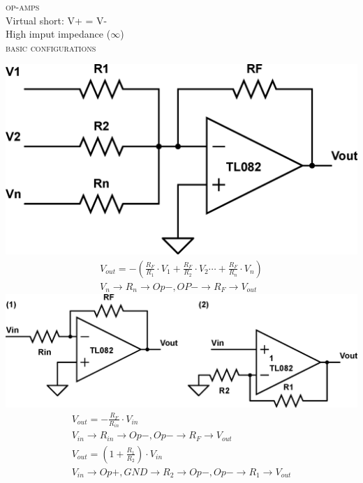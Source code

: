 \documentclass[10pt,letterpaper,english]{article}
\begin{document}
\textsc{op-amps}\\
Virtual short: V+ = V-\\
High imput impedance ($\infty$)\\
\textsc{basic configurations}
\begin{multicols}{2}
\includegraphics[scale=0.2]{opamp-1.eps}
\begin{align*}
V_{out} = -\left(\frac{R_F}{R_1}\cdot V_1 + \frac{R_F}{R_2}\cdot V_2 \cdots + \frac{R_F}{R_n}\cdot V_n\right)\\
V_n\rightarrow R_n\rightarrow Op-, OP- \rightarrow R_F \rightarrow V_{out}
\end{align*}
\includegraphics[scale=0.4]{opamp-2.eps}
\begin{align*}
V_{out} = -\frac{R_F}{R_{in}}\cdot V_{in} \tag*{(1) Inverting}\\
V_{in}\rightarrow R_{in} \rightarrow Op-, Op- \rightarrow R_F \rightarrow V_{out}\\
V_{out} = \left(1 + \frac{R_1}{R_2}\right)\cdot V_{in} \tag*{(2) Non-inverting}\\
V_{in}\rightarrow Op+, GND \rightarrow R_2 \rightarrow Op-, Op- \rightarrow R_1 \rightarrow V_{out}\\
\end{align*}
\end{multicols}
\end{document}
